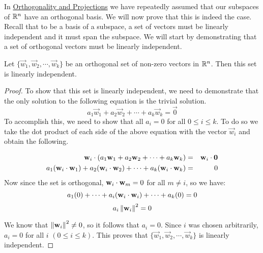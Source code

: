 \documentclass{ximera}
\begin{document}
In \href{https://ximera.osu.edu/oerlinalg/LinearAlgebra/RTH-0010/main}{Orthogonality and Projections} we have repeatedly assumed that our subspaces of $\mathbb{R}^n$ have an orthogonal basis.  We will now prove that this is indeed the case.  Recall that to be a basis of a subspace, a set of vectors must be linearly independent and it must span the subspace.  We will start by demonstrating that a set of orthogonal vectors must be linearly independent.

\begin{theorem}\label{orthbasis}
Let $ \{ \vec{w}_1, \vec{w}_2, \cdots, \vec{w}_k \}$ be an
orthogonal set of non-zero vectors in $\mathbb{R}^n$. Then this set is
linearly independent.%
\end{theorem}

\begin{proof}
To show that this set is linearly independent, we need to demonstrate that the only solution to the following equation is the trivial solution.
\[
a_1 \vec{w}_1 + a_2 \vec{w}_2 + \cdots + a_k \vec{w}_k = \vec{0}
\]
To accomplish this, we need to show that all $a_i = 0$ for all $0\leq i\leq k$.  To do so we take the dot product of
each side of the above equation with the vector $\vec{w}_i$ and obtain the following.

\begin{eqnarray*}
\mathbf{w}_i \cdot (a_1 \mathbf{w}_1 + a_2 \mathbf{w}_2 + \cdots + a_k \mathbf{w}_k ) &=& \mathbf{w}_i \cdot \mathbf{0}\\
a_1 (\mathbf{w}_i \cdot \mathbf{w}_1) + a_2 (\mathbf{w}_i \cdot \mathbf{w}_2) + \cdots + a_k (\mathbf{w}_i \cdot \mathbf{w}_k)  &=& 0
\end{eqnarray*}
Now since the set is orthogonal, $\mathbf{w}_i \cdot \mathbf{w}_m = 0$ for all $m \neq i$, so we have:
\[
a_1 (0) + \cdots + a_i(\mathbf{w}_i \cdot \mathbf{w}_i) + \cdots + a_k (0) = 0
\]
\[
a_i \left\lVert\mathbf{w}_i\right\rVert^2 = 0
\]

We know that $\left\lVert\mathbf{w}_i\right\rVert^2  \neq 0$, so it follows that $a_i =0$. Since $i$ was chosen arbitrarily, $a_i =0$ for all $i$ $(0\leq i\leq k)$. This proves that $\{ \vec{w}_1, \vec{w}_2, \cdots, \vec{w}_k \}$ is linearly independent.


\end{proof}
\end{document}
